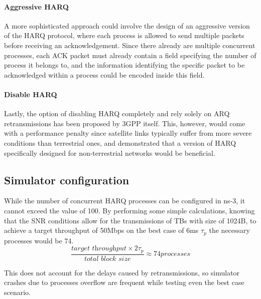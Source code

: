\paragraph{Aggressive HARQ}
A more sophisticated approach could involve the design of an aggressive version of the \ac{HARQ} protocol, where each process is allowed to send multiple packets before receiving an acknowledgement. Since there already are multiple concurrent processes, each \ac{ACK} packet must already contain a field specifying the number of process it belongs to, and the information identifying the specific packet to be acknowledged within a process could be encoded inside this field.
\paragraph{Disable \ac{HARQ}}
Lastly, the option of disabling \ac{HARQ} completely and rely solely on \ac{ARQ} retransmissions has been proposed by 3GPP itself\cite{hybrid-arq-schemes-muk}. This, however, would come with a performance penalty since satellite links typically suffer from more severe conditions than terrestrial ones, and \cite{5g-beyond-5g-ntn-trends-vanellicoralli} demonstrated that a version of \ac{HARQ} specifically designed for non-terrestrial networks would be beneficial.


\subsection{Simulator configuration}
While the number of concurrent HARQ processes can be configured in ns-3, it cannot exceed the value of 100. By performing some simple calculations, knowing that the \ac{SNR} conditions allow for the transmissions of \ac{TB}s with size of 1024B, to achieve a target throughput of 50Mbps on the best case of 6ms $\tau_p$ the necessary processes would be 74.
$$\frac{\textit{target throughput} \times 2\tau_p}{\textit{total block size}} \approx 74 \textit{processes}$$

This does not account for the delays caused by retransmissions, so simulator crashes due to processes overflow are frequent while testing even the best case scenario.

